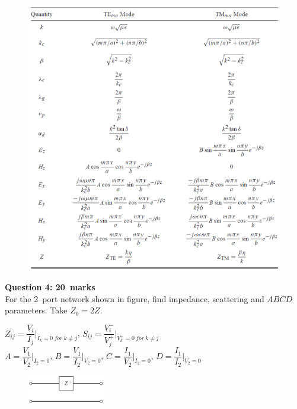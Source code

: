 \documentclass[12pt,a4paper]{article}
\def\Qfour{20}
\begin{document}
\newpage~
\newpage
\begin{figure}[H]
\centering
\includegraphics[width=\textwidth]{./WaveguideFormulas.png}
\label{fig:Waveguideformulas}
\end{figure}
\newpage
\noindent\textbf{Question 4: \hfill \Qfour~marks}\\
For the 2--port network shown in figure, find impedance, scattering and $ABCD$ parameters. Take $Z_0=2Z$.\\
\begin{flushleft}
$Z_{ij}=\dfrac{V_i}{I_j}\biggr\lvert_{I_k=0~for~k\neq j}$, $S_{ij}=\dfrac{V^-_i}{V^+_j}\biggr\lvert_{V^+_k=0~for~k\neq j}$\\[0.2cm]
$A=\dfrac{V_1}{V_2}\biggr\lvert_{I_2=0}$, $B=\dfrac{V_1}{I_2}\biggr\lvert_{V_2=0}$, $C=\dfrac{I_1}{V_2}\biggr\lvert_{I_2=0}$, $D=\dfrac{I_1}{I_2}\biggr\lvert_{V_2=0}$\\
\end{flushleft}
\begin{figure}[H]
\flushright
\vspace*{-4cm}
\includegraphics[width=0.3\textwidth]{./NetworkCircuit.png}
\label{fig:NetworkCircuit}
\end{figure}
\end{document}
